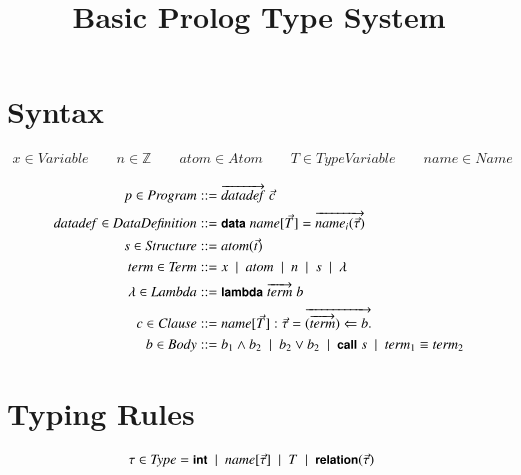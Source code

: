 \documentclass[10pt]{article}
\newcommand{\alt}{\ \mid\ }
\newcommand{\mtt}[1]{\ensuremath{\mathit{#1}}}
\newcommand{\anywhere}[1]{\ensuremath{\mbox{#1}}}
\newcommand{\kw}[1]{\anywhere{\sffamily{\bfseries\small {#1}}}}
\newcommand{\term}{\ensuremath{\mtt{term}}\xspace}
\newcommand{\atom}{\ensuremath{\mtt{atom}}\xspace}
\newcommand{\name}{\ensuremath{\mtt{name}}\xspace}
\newcommand{\datadef}{\ensuremath{\mtt{datadef}}\xspace}
\begin{document}
\title{Basic Prolog Type System}
\author{}
\date{}

\maketitle

\section{Syntax}

\begin{gather*}
  x \in \mtt{Variable} \qquad n \in \mathbb{Z} \qquad \atom \in \mtt{Atom} \qquad T \in \mtt{TypeVariable} \qquad \name \in \mtt{Name}
\end{gather*}

\begin{align*}
  p \in \mtt{Program} &::= \overrightarrow{\datadef}\;\vec{c}
  \\
  \datadef \in \mtt{DataDefinition} &::= \kw{data}\; \name[\vec{T}] = \overrightarrow{\name_i(\vec{\tau})}
  \\
  s \in \mtt{Structure} &::= \atom(\vec{t})
  \\
  \term \in \mtt{Term} &::= x \alt \atom \alt n \alt s \alt \lambda
  \\
  \lambda \in \mtt{Lambda} &::= \kw{lambda}\;\overrightarrow{\term}\;b
  \\
  c \in \mtt{Clause} &::= \name[\vec{T}] : \vec{\tau} = \overrightarrow{(\overrightarrow{\term}) \Leftarrow b.}
  \\
  b \in \mtt{Body} &::= b_1 \land b_2 \alt b_2 \lor b_2
  \alt \kw{call}\;s \alt \term_1 \equiv \term_2
\end{align*}

\section{Typing Rules}
\begin{align*}
  \tau \in \mtt{Type} &= \kw{int} \alt \name[\vec{\tau}] \alt T \alt \kw{relation}(\vec{\tau})
\end{align*}
\end{document}
